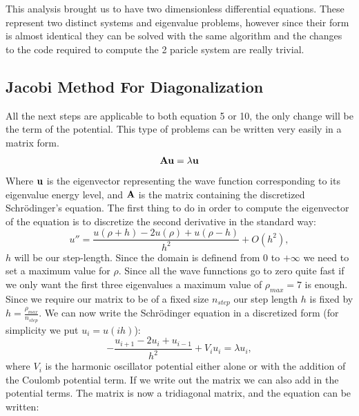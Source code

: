 \documentclass[10pt,a4paper,titlepage]{article}
\begin{document}
This analysis brought us to have two dimensionless differential equations. These represent two distinct systems and eigenvalue problems, however since 
their form is almost identical they can be solved with the same algorithm and the changes to the code required to compute the 2 paricle system are really
trivial.

\subsection*{Jacobi Method For Diagonalization}
All the next steps are applicable to both equation 5 or 10, the only change will be the term of the potential. This type of problems can be written very
easily in a matrix form. 
\[
{\bf Au } = \lambda {\bf u}
\]
Where ${\bf u }$ is the eigenvector representing the wave function corresponding to its eigenvalue energy level, and ${\bf A }$ is the matrix containing 
the discretized Schr\"odinger's equation. The first thing to do in order to compute the eigenvector of the equation is to discretize the second derivative
in the standard way:
\begin{equation}
    u''=\frac{u(\rho+h) -2u(\rho) +u(\rho-h)}{h^2} +O(h^2),
\end{equation} 
$h$ will be our step-length. Since the domain is definend from $0$ to $+\infty$ we need to set a maximum value for $\rho$. Since all the wave funnctions 
go to zero quite fast if we only want the first three eigenvalues a maximum value of $\rho_{max} = 7$ is enough. Since we require our matrix to be of a 
fixed size $n_{step}$ our step length  $h$ is fixed by $h=\frac{\rho_{max}}{n_{step}}$. 
We can now write the Schr\"odinger equation in a discretized form (for simplicity we put $u_i = u(ih)$):
\begin{equation}
-\frac{u_{i+1} -2u_i +u_{i-1} }{h^2}+V_iu_i  = \lambda u_i,
\end{equation}
where $V_i$ is the harmonic oscillator potential either alone or with the addition of the Coulomb potential term. If we write out the matrix we can also 
add in the potential terms. The matrix is now a tridiagonal matrix, and the equation can be written:
\end{document}
